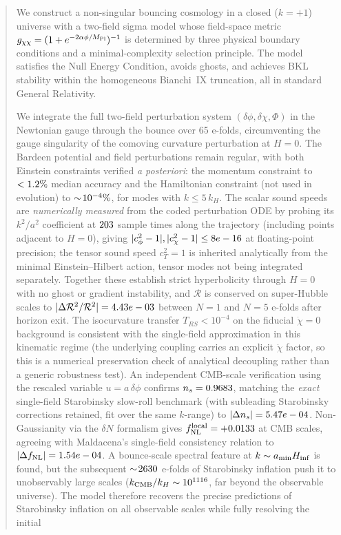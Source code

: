 \documentclass[11pt,a4paper]{article}
\begin{document}
\maketitle

\begin{abstract}
We construct a non-singular bouncing cosmology in a closed ($k=+1$) universe with a two-field sigma model whose field-space metric $g_{\chi\chi} = (1 + e^{-2\alpha\phi/M_{\rm Pl}})^{-1}$ is determined by three physical boundary conditions and a minimal-complexity selection principle. The model satisfies the Null Energy Condition, avoids ghosts, and achieves BKL stability within the homogeneous Bianchi~IX truncation, all in standard General Relativity.

We integrate the full two-field perturbation system $(\delta\phi, \delta\chi, \Phi)$ in the Newtonian gauge through the bounce over 65 e-folds, circumventing the gauge singularity of the comoving curvature perturbation at $H=0$. The Bardeen potential and field perturbations remain regular, with both Einstein constraints verified \emph{a posteriori}: the momentum constraint to $< \constraintMedian\%$ median accuracy and the Hamiltonian constraint (not used in evolution) to $\sim\!\HCmedian\%$, for modes with $k \leq 5\,k_H$. The scalar sound speeds are \emph{numerically measured} from the coded perturbation ODE by probing its $k^2/a^2$ coefficient at $\cSProbeCount$ sample times along the trajectory (including points adjacent to $H=0$), giving $|c_\phi^2-1|, |c_\chi^2-1| \leq \cSSqMaxDev$ at floating-point precision; the tensor sound speed $c_T^2 = 1$ is inherited analytically from the minimal Einstein--Hilbert action, tensor modes not being integrated separately. Together these establish strict hyperbolicity through $H=0$ with no ghost or gradient instability, and $\mathcal{R}$ is conserved on super-Hubble scales to $|\Delta\mathcal{R}^2/\mathcal{R}^2| = \RConservationDelta$ between $N = 1$ and $N = 5$ e-folds after horizon exit. The isocurvature transfer $T_{RS} < 10^{-4}$ on the fiducial $\dot\chi = 0$ background is consistent with the single-field approximation in this kinematic regime (the underlying coupling carries an explicit $\dot\chi$ factor, so this is a numerical preservation check of analytical decoupling rather than a generic robustness test). An independent CMB-scale verification using the rescaled variable $u = a\,\delta\phi$ confirms $n_s = \nsCMBnumerical$, matching the \emph{exact} single-field Starobinsky slow-roll benchmark (with subleading Starobinsky corrections retained, fit over the same $k$-range) to $|\Delta n_s| = \nsCMBdelta$. Non-Gaussianity via the $\delta N$ formalism gives $f_{\rm NL}^{\rm local} = \fNLCMBdeltaN$ at CMB scales, agreeing with Maldacena's single-field consistency relation to $|\Delta f_{\rm NL}| = \fNLCMBdelta$. A bounce-scale spectral feature at $k \sim a_{\rm min} H_{\rm inf}$ is found, but the subsequent $\sim\!\bumpNtotal$ e-folds of Starobinsky inflation push it to unobservably large scales ($k_{\rm CMB}/k_H \sim 10^{\logTenkCMBoverkH}$, far beyond the observable universe). The model therefore recovers the precise predictions of Starobinsky inflation on all observable scales while fully resolving the initial 
\end{abstract}
\end{document}
